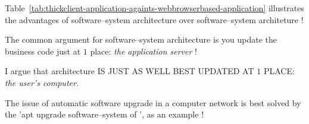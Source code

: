 \begin{table*}[!htbp]
\centering
{}
\caption{Thick--client application VS Web--browser--based application.\\}
\label{tab:thickclient-application-againts-webbrowserbased-application}
\end{table*}

Table~\ref{tab:thickclient-application-againts-webbrowserbased-application}
illustrates the advantages of \thickclient
software--system architecture over \webbrowserbased
software--system architeture !
\newline

\textcolor{purplish}{
The common argument for \webbrowserbased software--system 
architecture is you update the business code just at $1$
place: \emph{the application server} !}

\textcolor{purplish}{
I argue that \thickclient architecture IS JUST AS WELL
BEST UPDATED AT $1$ PLACE: \emph{the user's computer}.}

\textcolor{purplish}{
The issue of automatic software upgrade in a computer
network is best solved by the 'apt upgrade software--system
of \debianlinux', as an example !
}